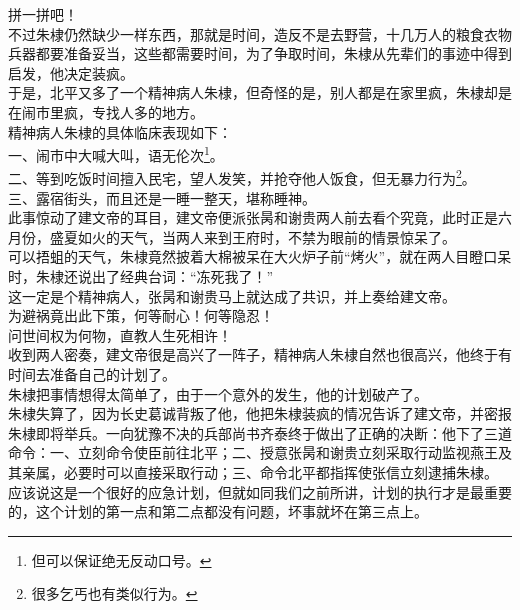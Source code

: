 \begin{multicols}{\theparacolNo}
拼一拼吧！\\

不过朱棣仍然缺少一样东西，那就是时间，造反不是去野营，十几万人的粮食衣物兵器都要准备妥当，这些都需要时间，为了争取时间，朱棣从先辈们的事迹中得到启发，他决定装疯。\\

于是，北平又多了一个精神病人朱棣，但奇怪的是，别人都是在家里疯，朱棣却是在闹市里疯，专找人多的地方。\\

精神病人朱棣的具体临床表现如下：\\

一、闹市中大喊大叫，语无伦次\footnote{但可以保证绝无反动口号。}。\\

二、等到吃饭时间擅入民宅，望人发笑，并抢夺他人饭食，但无暴力行为\footnote{很多乞丐也有类似行为。}。\\

三、露宿街头，而且还是一睡一整天，堪称睡神。\\

此事惊动了建文帝的耳目，建文帝便派张昺和谢贵两人前去看个究竟，此时正是六月份，盛夏如火的天气，当两人来到王府时，不禁为眼前的情景惊呆了。\\

可以捂蛆的天气，朱棣竟然披着大棉被呆在大火炉子前“烤火”，就在两人目瞪口呆时，朱棣还说出了经典台词：“冻死我了！”\\

这一定是个精神病人，张昺和谢贵马上就达成了共识，并上奏给建文帝。\\

为避祸竟出此下策，何等耐心！何等隐忍！\\

问世间权为何物，直教人生死相许！\\

收到两人密奏，建文帝很是高兴了一阵子，精神病人朱棣自然也很高兴，他终于有时间去准备自己的计划了。\\

朱棣把事情想得太简单了，由于一个意外的发生，他的计划破产了。\\

朱棣失算了，因为长史葛诚背叛了他，他把朱棣装疯的情况告诉了建文帝，并密报朱棣即将举兵。一向犹豫不决的兵部尚书齐泰终于做出了正确的决断：他下了三道命令：一、立刻命令使臣前往北平；二、授意张昺和谢贵立刻采取行动监视燕王及其亲属，必要时可以直接采取行动；三、命令北平都指挥使张信立刻逮捕朱棣。\\

应该说这是一个很好的应急计划，但就如同我们之前所讲，计划的执行才是最重要的，这个计划的第一点和第二点都没有问题，坏事就坏在第三点上。\\


\end{multicols}
